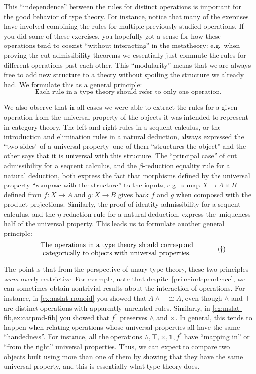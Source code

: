 \documentclass{book}
\let\meet\wedge
\def\unit{\mathbf{1}}
\begin{document}
This ``independence'' between the rules for distinct operations is important for the good behavior of type theory.
For instance, notice that many of the exercises have involved combining the rules for multiple previously-studied operations.
If you did some of these exercises, you hopefully got a sense for how these operations tend to coexist ``without interacting'' in the metatheory: e.g.\
when proving the cut-admissibility theorems we essentially just commute the rules for different operations past each other.
This ``modularity'' means that we are always free to add new structure to a theory without spoiling the structure we already had.
We formulate this as a general principle:
\begin{equation}\label{princ:independence}
  \text{Each rule in a type theory should refer to only one operation}.\tag{$\ast$}
\end{equation}

We also observe that in all cases we were able to extract the rules for a given operation from the universal property of the objects it was intended to represent in category theory.
The left and right rules in a sequent calculus, or the introduction and elimination rules in a natural deduction, always expressed the ``two sides'' of a universal property: one of them ``structures the object'' and the other says that it is universal with this structure.
The ``principal case'' of cut admissibility for a sequent calculus, and the $\beta$-reduction equality rule for a natural deduction, both express the fact that morphisms defined by the universal property ``compose with the structure'' to the inputs, e.g.\ a map $X\to A\times B$ defined from $f:X\to A$ and $g:X\to B$ gives back $f$ and $g$ when composed with the product projections.
Similarly, the proof of identity admissibility for a sequent calculus, and the $\eta$-reduction rule for a natural deduction, express the uniqueness half of the universal property.
This leads us to formulate another general principle:
\begin{equation}\label{princ:ump}
  \parbox{3.5in}{\centering The operations in a type theory should correspond categorically to objects with universal properties.}\tag{$\dagger$}
\end{equation}

The point is that from the perspective of unary type theory, these two principles \emph{seem} overly restrictive.
For example, note that despite~\eqref{princ:independence}, we can sometimes obtain nontrivial results about the interaction of operations.
For instance, in \cref{ex:mslat-monoid} you showed that $A\meet \top\cong A$, even though $\meet$ and $\top$ are distinct operations with apparently unrelated rules.
Similarly, in \cref{ex:mslat-fib,ex:catprod-fib} you showed that $f^*$ preserves $\meet$ and $\times$.
In general, this tends to happen when relating operations whose universal properties all have the same ``handedness''.
For instance, all the operations $\meet,\top,\times,\unit,f^*$ have ``mapping in'' or ``from the right'' universal properties.
Thus, we can expect to compare two objects built using more than one of them by showing that they have the same universal property, and this is essentially what type theory does.
\end{document}
